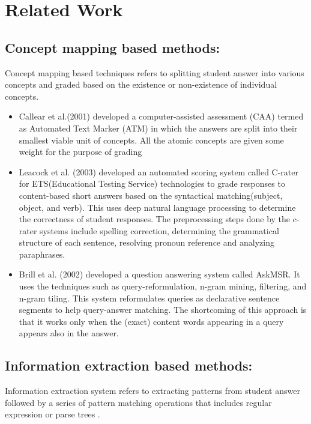 \documentclass[rnd]{mas_proposal}
\begin{document}
\chapter{Related Work}

\section{Concept mapping based methods:}
	Concept mapping based techniques refers to splitting student answer into various concepts and graded based on the existence or non-existence of individual concepts\cite{Burrows2015}.
	
	\begin{itemize}
	 \item Callear et al.(2001) \cite{Callear2001}	developed a  computer-assisted assessment (CAA) termed as Automated Text Marker (ATM) in which the answers are  split  into  their  smallest  viable  unit  of concepts. All the atomic concepts are given some weight for the purpose of grading

	\item Leacock et al. (2003)\cite{Leacock2003} developed an automated scoring system called C-rater for ETS(Educational Testing Service) technologies to grade responses to content-based short answers based on the syntactical matching(subject, object, and verb). This uses deep natural language processing to determine the correctness of student responses. The preprocessing steps done by the c-rater systems include spelling correction, determining the grammatical structure of each sentence, resolving pronoun reference and analyzing paraphrases.
	
	  \item Brill et al. (2002) \cite{Brill2002} developed a question answering system called AskMSR. It uses the techniques such as query-reformulation, n-gram mining, filtering, and n-gram tiling. This system reformulates queries as declarative sentence segments to help query-answer matching. The shortcoming of this approach is that it works only when the (exact) content words appearing in a query appears also in the answer.
	
\end{itemize}


\section{Information extraction based methods:}

	Information extraction system refers to 
extracting patterns from student answer followed by a series of pattern matching operations that includes regular expression or parse trees \cite{Burrows2015}.
\end{document}
